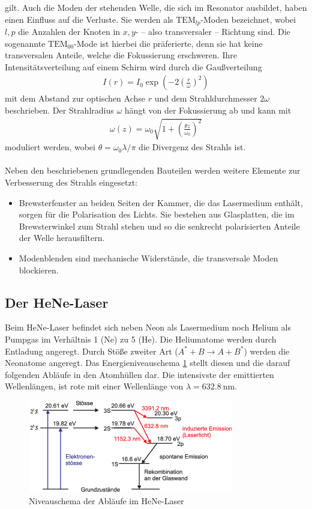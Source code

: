 gilt.
Auch die Moden der stehenden Welle, die sich im Resonator ausbildet, haben einen Einfluss auf die Verluste. Sie werden als $\text{TEM}_{lp}$-Moden bezeichnet, wobei $l,p$ die Anzahlen der Knoten in $x,y$- -- also transversaler -- Richtung sind. Die sogenannte $\text{TEM}_{00}$-Mode ist hierbei die präferierte, denn sie hat keine transversalen Anteile, welche die Fokussierung erschweren. Ihre Intensitätsverteilung auf einem Schirm wird durch die Gaußverteilung
\begin{align}\label{eq:intensity}
	I(r) = I_0\exp\left(-2\left(\frac{r}{\omega}\right)^2\right)
\end{align}
mit dem Abstand zur optischen Achse $r$ und dem Strahldurchmesser $2\omega$ beschrieben. Der Strahlradius $\omega$ hängt von der Fokussierung ab und kann mit
\begin{align}
	\omega(z) = \omega_0\sqrt{1+\left(\frac{\theta z}{\omega_0}\right)^2}
\end{align}
moduliert werden, wobei $\theta = \omega_0\lambda\slash\pi$ die Divergenz des Strahls ist. \\
\ \\
Neben den beschriebenen grundlegenden Bauteilen werden weitere Elemente zur Verbesserung des Strahls eingesetzt:
\begin{itemize}
	\item Brewsterfenster an beiden Seiten der Kammer, die das Lasermedium enthält, sorgen für die Polarisation des Lichts. Sie bestehen aus Glasplatten, die im Brewsterwinkel zum Strahl stehen und so die senkrecht polarisierten Anteile der Welle herausfiltern.
	\item Modenblenden sind mechanische Widerstände, die transversale Moden blockieren.
\end{itemize}
\subsection{Der HeNe-Laser}
Beim HeNe-Laser befindet sich neben Neon als Lasermedium noch Helium als Pumpgas im Verhältnis 1 (Ne) zu 5 (He). Die Heliumatome werden durch Entladung angeregt. Durch Stöße zweiter Art ($A^* + B \rightarrow A + B^*$) werden die Neonatome angeregt. Das Energieniveauschema \ref{fig:Niveaus} stellt diesen und die darauf folgenden Abläufe in den Atomhüllen dar. Die intensivste der emittierten Wellenlängen, ist rote mit einer Wellenlänge von $\lambda = \SI{632.8}{\nano\metre}$.
\begin{figure}[h!]
	\centering
	\includegraphics[width=.6\textwidth]{Niveauschema.png}
	\caption{Niveauschema der Abläufe im HeNe-Laser \cite{Niveaus}}
	\label{fig:Niveaus}
\end{figure}